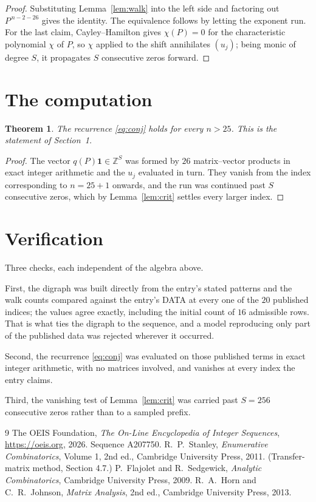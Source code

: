 \documentclass[11pt,a4paper]{article}
\theoremstyle{plain}
\newtheorem{theorem}{Theorem}
\theoremstyle{definition}
\begin{document}
\begin{proof}
Substituting Lemma~\ref{lem:walk} into the left side and factoring out
$P^{\,n-2-26}$ gives the identity. The equivalence follows by letting the exponent
run. For the last claim, Cayley--Hamilton gives $\chi(P)=0$ for the characteristic
polynomial $\chi$ of $P$, so $\chi$ applied to the shift annihilates $(u_j)$; being monic of
degree $S$, it propagates $S$ consecutive zeros forward.
\end{proof}

\section{The computation}

\begin{theorem}
The recurrence \eqref{eq:conj} holds for every $n>25$. This is the statement of
Section~1.
\end{theorem}

\begin{proof}
The vector $q(P)\mathbf{1}\in\mathbb{Z}^{S}$ was formed by $26$ matrix--vector
products in exact integer arithmetic and the $u_j$ evaluated in turn. They vanish from the
index corresponding to $n=25+1$ onwards, and the run was continued past $S$ consecutive
zeros, which by Lemma~\ref{lem:crit} settles every larger index.
\end{proof}

\section{Verification}

Three checks, each independent of the algebra above.

First, the digraph was built directly from the entry's stated patterns and the walk counts
compared against the entry's DATA at every one of the $20$ published indices; the
values agree exactly, including the initial count of $16$ admissible rows. That is
what ties the digraph to the sequence, and a model reproducing only part of the published
data was rejected wherever it occurred.

Second, the recurrence \eqref{eq:conj} was evaluated on those published terms in exact
integer arithmetic, with no matrices involved, and vanishes at every index the entry claims.

Third, the vanishing test of Lemma~\ref{lem:crit} was carried past $S=256$ consecutive
zeros rather than to a sampled prefix.

\begin{thebibliography}{9}
 The OEIS Foundation, \emph{The On-Line Encyclopedia of Integer
Sequences}, \url{https://oeis.org}, 2026. Sequence A207750.
 R.~P.~Stanley, \emph{Enumerative Combinatorics}, Volume 1, 2nd ed.,
Cambridge University Press, 2011. (Transfer-matrix method, Section 4.7.)
 P.~Flajolet and R.~Sedgewick, \emph{Analytic Combinatorics}, Cambridge
University Press, 2009.
 R.~A.~Horn and C.~R.~Johnson, \emph{Matrix Analysis}, 2nd ed., Cambridge
University Press, 2013.
\end{thebibliography}
\end{document}
